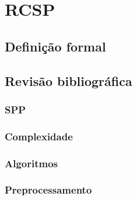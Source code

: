 \chapter{RCSP}
\label{cap:rcsp}

\section{Definição formal}
\label{sec:definicao}


\section{Revisão bibliográfica}
\label{sec:revisao}


\subsection{SPP}
\label{subsec:spp}

\subsection{Complexidade}
\label{subsec:complexidade}


\subsection{Algoritmos}
\label{subsec:algoritmos}

\subsection{Preprocessamento}
\label{subsec:preprocessamento}
